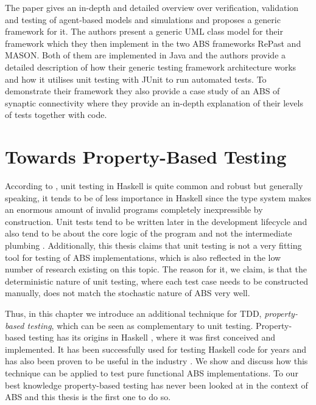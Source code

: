 The paper \cite{gurcan_generic_2013} gives an in-depth and detailed overview over verification, validation and testing of agent-based models and simulations and proposes a generic framework for it. The authors present a generic UML class model for their framework which they then implement in the two ABS frameworks RePast and MASON. Both of them are implemented in Java and the authors provide a detailed description of how their generic testing framework architecture works and how it utilises unit testing with JUnit to run automated tests. To demonstrate their framework they also provide a case study of an ABS of synaptic connectivity where they provide an in-depth explanation of their levels of tests together with code.

\section{Towards Property-Based Testing}
According to \cite{diehl_wishknewhaskell}, unit testing in Haskell is quite common and robust but generally speaking, it tends to be of less importance in Haskell since the type system makes an enormous amount of invalid programs completely inexpressible by construction. Unit tests tend to be written later in the development lifecycle and also tend to be about the core logic of the program and not the intermediate plumbing \cite{diehl_wishknewhaskell}. Additionally, this thesis claims that unit testing is not a very fitting tool for testing of ABS implementations, which is also reflected in the low number of research existing on this topic. The reason for it, we claim, is that the deterministic nature of unit testing, where each test case needs to be constructed manually, does not match the stochastic nature of ABS very well.

Thus, in this chapter we introduce an additional technique for TDD, \textit{property-based testing}, which can be seen as complementary to unit testing. Property-based testing has its origins in Haskell \cite{claessen_quickcheck_2000,claessen_testing_2002,runciman_smallcheck_2008}, where it was first conceived and implemented. It has been successfully used for testing Haskell code for years and has also been proven to be useful in the industry \cite{hughes_quickcheck_2007}. We show and discuss how this technique can be applied to test pure functional ABS implementations. To our best knowledge property-based testing has never been looked at in the context of ABS and this thesis is the first one to do so.


